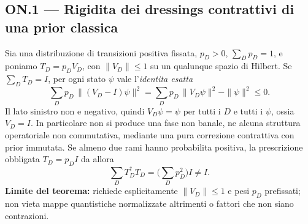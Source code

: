 \documentclass[11pt,a4paper]{article}
\begin{document}
\subsection*{ON.1 --- Rigidita dei dressings contrattivi di una prior classica}
Sia una distribuzione di transizioni positiva fissata, $p_D>0$, $\sum_Dp_D=1$, e poniamo $T_D=p_DV_D$, con $\|V_D\|\le1$ su un qualunque spazio di Hilbert. Se $\sum_DT_D=I$, per ogni stato $\psi$ vale l'\emph{identita esatta}
\begin{equation}
 \boxed{\sum_Dp_D\,\|(V_D-I)\psi\|^2
   =\sum_Dp_D\,\|V_D\psi\|^2-\|\psi\|^2\le0.}
 \tag{ON.1}
\end{equation}
Il lato sinistro non e negativo, quindi $V_D\psi=\psi$ per tutti i $D$ e tutti i $\psi$, ossia $V_D=I$. In particolare non si produce una fase non banale, ne alcuna struttura operatoriale non commutativa, mediante una pura correzione contrattiva con prior immutata. Se almeno due rami hanno probabilita positiva, la prescrizione obbligata $T_D=p_DI$ da allora
\begin{equation}
 \sum_D T_D^\dagger T_D=\Big(\sum_Dp_D^2\Big)I\ne I.
 \tag{ON.2}
\end{equation}
\textbf{Limite del teorema:} richiede esplicitamente $\|V_D\|\le1$ e pesi $p_D$ prefissati; non vieta mappe quantistiche normalizzate altrimenti o fattori che non siano contrazioni.
\end{document}
